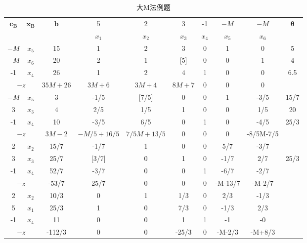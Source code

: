 \documentclass{book}
\begin{document}
    \begin{table}[h]
        \centering
        \begin{tabular}{c|c|c|cccccc|c}
            \hline
             \multirow{2}{*}{$\boldsymbol{c_B}$}& \multirow{2}{*}{$\boldsymbol{x_B}$} & \multirow{2}{*}{$\boldsymbol{b}$} & 5 & 2 & 3 & -1 & $-M$ & $-M$ & \multirow{2}{*}{$\boldsymbol{\theta}$} \\
             \cline{4-9}
             &&& $x_1$ & $x_2$ & $x_3$ & $x_4$ & $x_5$ & $x_6$ &\\
             \hline
             $-M$ & $x_5$ & 15 & 1 & 2 & 3 & 0 & 1 & 0 & 5\\
             $-M$ & $x_6$ & 20 & 2 & 1 & [5] & 0 & 0 & 1 & 4\\
             -1 & $x_4$ & 26 & 1 & 2 & 4 & 1 & 0 & 0 & 6.5\\
             \hline
             \multicolumn{2}{c|}{$-z$}  & $35M+26$ & $3M+6$ & $3M+4$ & $8M+7$ & 0 & 0 & 0 &\\
             \hline
             $-M$ & $x_5$ & 3 & -1/5 & [7/5] & 0 & 0 & 1 & -3/5 & 15/7\\
             3 & $x_3$ & 4 & 2/5 & 1/5 & 1 & 0 & 0 & 1/5 & 20\\
             -1 & $x_4$ & 10 & -3/5 & 6/5 & 0 & 1 & 0 & -4/5 & 25/3\\
             \hline
             \multicolumn{2}{c|}{$-z$}  & $3M-2$ & $-M/5+16/5$ & $7/5M+13/5$ & 0 & 0 & 0 & -8/5M-7/5 &\\
             \hline
             2 & $x_2$ & 15/7 & -1/7 & 1 & 0 & 0 & 5/7 & -3/7 & \\
             3 & $x_3$ & 25/7 & [3/7] & 0 & 1 & 0 & -1/7 & 2/7 & 25/3\\
             -1 & $x_4$ & 52/7 & -3/7 & 0 & 0 & 1 & -6/7 & -2/7 & \\
             \hline
             \multicolumn{2}{c|}{$-z$}  & -53/7 & 25/7 & 0 & 0 & 0 & -M-13/7 & -M-2/7 &\\
             \hline
             2 & $x_2$ & 10/3 & 0 & 1 & 1/3 & 0 & 2/3 & -1/3 & \\
             5 & $x_1$ & 25/3 & 1 & 0 & 7/3 & 0 & -1/3 & 2/3 & \\
             -1 & $x_4$ & 11 & 0 & 0 & 1 & 1 & -1 & -0 & \\
             \hline
             \multicolumn{2}{c|}{$-z$}  & -112/3 & 0 & 0 & -25/3 & 0 & -M-2/3 & -M+8/3 &\\
             \hline
        \end{tabular}
        \caption{大M法例题}
        \label{tab:example de big M method}
    \end{table}
\end{document}
